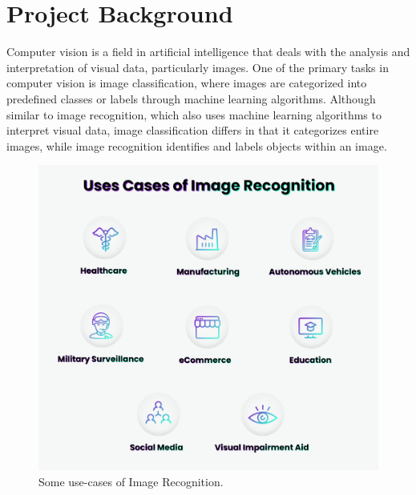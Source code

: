 \documentclass[../main.tex]{subfiles}
\begin{document}
\part*{Project Background}
Computer vision is a field in artificial intelligence that deals with the analysis and interpretation of visual data, particularly images. One of the primary tasks in computer vision is image classification, where images are categorized into predefined classes or labels through machine learning algorithms. Although similar to image recognition, which also uses machine learning algorithms to interpret visual data, image classification differs in that it categorizes entire images, while image recognition identifies and labels objects within an image.


\begin{figure}[h!]
\centering
\includegraphics[scale=0.4]{images/image_rec_uses.png}
\caption{Some use-cases of Image Recognition.\citet{im}}
\label{fig:im_uses}
\end{figure}
\end{document}
